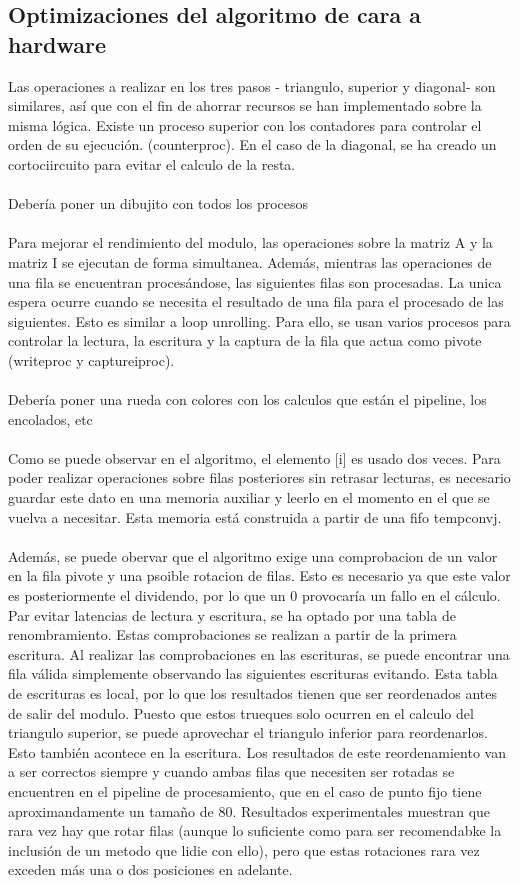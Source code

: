 \subsection{Optimizaciones del algoritmo de cara a hardware}
Las operaciones a realizar en los tres pasos - triangulo, superior y diagonal- son similares, así que con el fin de ahorrar recursos se han implementado sobre la misma lógica. Existe un proceso superior con los contadores para controlar el orden de su ejecución. (counterproc). En el caso de la diagonal, se ha creado un cortociircuito para evitar el calculo de la resta.
\\
\\
Debería poner un dibujito con todos los procesos
\\
\\
Para mejorar el rendimiento del modulo, las operaciones sobre la matriz A y la matriz I se ejecutan de forma simultanea. Además, mientras las operaciones de una fila se encuentran procesándose, las siguientes filas son procesadas. La unica espera ocurre cuando se necesita el resultado de una fila para el procesado de las siguientes. Esto es similar a loop unrolling. Para ello, se usan varios procesos para controlar la lectura, la escritura y la captura de la fila que actua como pivote (writeproc y captureiproc). 
\\
\\
Debería poner una rueda con colores con los calculos que están el pipeline, los encolados, etc
\\
\\
Como se puede observar en el algoritmo, el elemento [i] es usado dos veces. Para poder realizar operaciones sobre filas posteriores sin retrasar lecturas, es necesario guardar este dato en una memoria auxiliar y leerlo en el momento en el que se vuelva a necesitar. Esta memoria está construida a partir de una fifo tempconvj.
\\
\\
Además, se puede obervar que el algoritmo exige una comprobacion de un valor en la fila pivote y una psoible rotacion de filas. Esto es necesario ya que este valor es posteriormente el dividendo, por lo que un 0 provocaría un fallo en el cálculo. Par evitar latencias de lectura y escritura, se ha optado por una tabla de renombramiento. Estas comprobaciones se realizan a partir de la primera escritura. Al realizar las comprobaciones en las escrituras, se puede encontrar una fila válida simplemente observando las siguientes escrituras evitando. Esta tabla de escrituras es local, por lo que los resultados tienen que ser reordenados antes de salir del modulo. Puesto que estos trueques solo ocurren en el calculo del triangulo superior, se puede aprovechar el triangulo inferior para reordenarlos. Esto también acontece en la escritura. Los resultados de este reordenamiento van a ser correctos siempre y cuando ambas filas que necesiten ser rotadas se encuentren en el pipeline de procesamiento, que en el caso de  punto fijo tiene aproximandamente un tamaño de 80. Resultados experimentales muestran que rara vez hay que rotar filas (aunque lo suficiente como para ser recomendabke la inclusión de un metodo que lidie con ello), pero que estas rotaciones rara vez exceden más una o dos posiciones en adelante.
